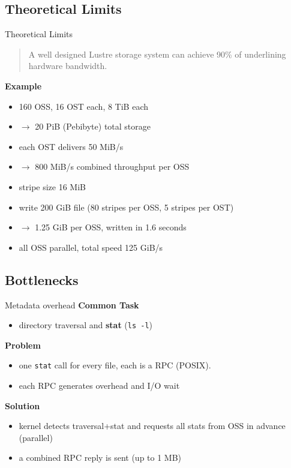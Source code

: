 \subsection{Theoretical Limits}
\begin{frame}{Theoretical Limits}
    \begin{quote}
        A well designed Lustre storage system can achieve
        90\% of underlining hardware bandwidth.

        \hspace*{}
    \end{quote}

    \pause

    \textbf{Example}

    \begin{itemize}
        \item<+-> 160 OSS, 16 OST each, 8 TiB each
        \item<+-> $\rightarrow$ 20 PiB (Pebibyte) total storage
        \item<+-> each OST delivers 50 MiB/s
        \item<+-> $\rightarrow$ 800 MiB/s combined throughput per OSS
        \item<+-> stripe size 16 MiB
        \item<+-> write 200 GiB file (80 stripes per OSS, 5 stripes per OST)
        \item<+-> $\rightarrow$ 1.25 GiB per OSS, written in 1.6 seconds
        \item<+-> all OSS parallel, total speed 125 GiB/s
    \end{itemize}
\end{frame}

\subsection{Bottlenecks}
\begin{frame}{Metadata overhead}
    \textbf{Common Task}
    \begin{itemize}
        \item directory traversal and \textbf{stat} (\texttt{ls -l})
    \end{itemize}

    \textbf{Problem}
    \begin{itemize}
        \item one \texttt{stat} call for every file, each is a RPC (POSIX).
        \item each RPC generates overhead and I/O wait
    \end{itemize}

    \textbf{Solution}
    \begin{itemize}
        \item kernel detects traversal+stat and requests all stats from OSS in advance (parallel)
        \item a combined RPC reply is sent (up to 1 MB)
    \end{itemize}
\end{frame}

